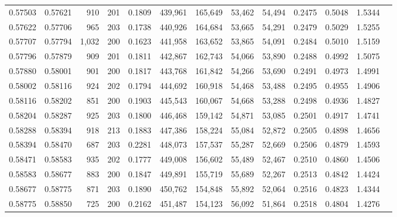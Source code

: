 \begin{tabular}{rrrrrrrrrrrrr}
0.57503 & 0.57621 &   910 & 201 &                                     0.1809 & 439,961 & 165,649 &  53,462 &  54,494 & 0.2475 & 0.5048 & 1.5344 \\
0.57622 & 0.57706 &   965 & 203 &                                     0.1738 & 440,926 & 164,684 &  53,665 &  54,291 & 0.2479 & 0.5029 & 1.5255 \\
0.57707 & 0.57794 & 1,032 & 200 &                                     0.1623 & 441,958 & 163,652 &  53,865 &  54,091 & 0.2484 & 0.5010 & 1.5159 \\
0.57796 & 0.57879 &   909 & 201 &                                     0.1811 & 442,867 & 162,743 &  54,066 &  53,890 & 0.2488 & 0.4992 & 1.5075 \\
0.57880 & 0.58001 &   901 & 200 &                                     0.1817 & 443,768 & 161,842 &  54,266 &  53,690 & 0.2491 & 0.4973 & 1.4991 \\
0.58002 & 0.58116 &   924 & 202 &                                     0.1794 & 444,692 & 160,918 &  54,468 &  53,488 & 0.2495 & 0.4955 & 1.4906 \\
0.58116 & 0.58202 &   851 & 200 &                                     0.1903 & 445,543 & 160,067 &  54,668 &  53,288 & 0.2498 & 0.4936 & 1.4827 \\
0.58204 & 0.58287 &   925 & 203 &                                     0.1800 & 446,468 & 159,142 &  54,871 &  53,085 & 0.2501 & 0.4917 & 1.4741 \\
0.58288 & 0.58394 &   918 & 213 &                                     0.1883 & 447,386 & 158,224 &  55,084 &  52,872 & 0.2505 & 0.4898 & 1.4656 \\
0.58394 & 0.58470 &   687 & 203 &                                     0.2281 & 448,073 & 157,537 &  55,287 &  52,669 & 0.2506 & 0.4879 & 1.4593 \\
0.58471 & 0.58583 &   935 & 202 &                                     0.1777 & 449,008 & 156,602 &  55,489 &  52,467 & 0.2510 & 0.4860 & 1.4506 \\
0.58583 & 0.58677 &   883 & 200 &                                     0.1847 & 449,891 & 155,719 &  55,689 &  52,267 & 0.2513 & 0.4842 & 1.4424 \\
0.58677 & 0.58775 &   871 & 203 &                                     0.1890 & 450,762 & 154,848 &  55,892 &  52,064 & 0.2516 & 0.4823 & 1.4344 \\
0.58775 & 0.58850 &   725 & 200 &                                     0.2162 & 451,487 & 154,123 &  56,092 &  51,864 & 0.2518 & 0.4804 & 1.4276 \\

\end{tabular}
